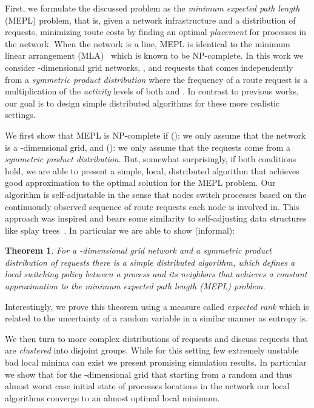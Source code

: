 \documentclass[conference]{IEEEtran}
\newcommand{\rmnum}[1]{\romannumeral #1}
\newtheorem*{theorem*}{Theorem}
\begin{document}
First, we formulate the discussed problem as the \emph{minimum expected path length} (MEPL) problem, that is, given a network infrastructure and a distribution of requests, minimizing route costs by finding an optimal \emph{placement} for processes in the network.
When the network is a line, MEPL is identical to the minimum linear arrangement (MLA)~\cite{johnson1979computers} which is known to be NP-complete.
In this work we consider -dimensional grid networks, , and requests that comes independently from a \emph{symmetric product distribution} where the frequency of a route request  is a multiplication of the \emph{activity} levels of both  and . 
In contrast to previous works, our goal is to design simple distributed algorithms for these more realistic settings.

We first show that MEPL is NP-complete if (\rmnum{1}): we only assume that the network is a -dimensional grid, and (\rmnum{2}): we only assume that the requests come from a \emph{symmetric product distribution}.
But, somewhat surprisingly, if both conditions hold, we are able to present a simple, local, distributed algorithm that achieves good approximation to the optimal solution for the MEPL problem.
Our algorithm is self-adjustable in the sense that nodes switch processes based on the continuously observed sequence of route requests each node is involved in. This approach was inspired and bears some similarity to self-adjusting data structures like splay trees~\cite{sleator1985self}. In particular we are able to show (informal):
\begin{theorem*} For a \emph{-dimensional grid} network and a \emph{symmetric product distribution} of requests there is a simple distributed algorithm, which defines a local switching policy between a process and its neighbors that achieves a \emph{constant} approximation to the minimum expected path length (MEPL) problem.
\end{theorem*}
Interestingly, we prove this theorem using a measure called \emph{expected rank} which is related to the uncertainty of a random variable in a similar manner as entropy is.

We then turn to more complex distributions of requests and discuss requests that are \emph{clustered} into disjoint groups. While for this setting few extremely unstable bad local minima can exist we present promising simulation results. In particular we show that for the -dimensional grid that starting from a random and thus almost worst case initial state of processes locations in the network our local algorithms converge to an almost optimal local minimum. 
\end{document}
